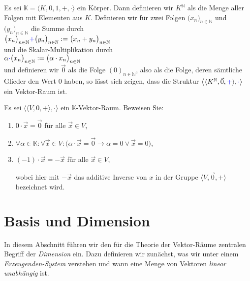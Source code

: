 \example
Es sei $\mathbb{K} = \langle K, 0,1,+,\cdot\rangle$ ein K\"{o}rper.  Dann definieren wir $K^\mathbb{N}$ als die Menge aller
Folgen mit Elementen aus $K$.  Definieren wir f\"{u}r zwei
Folgen
$\bigl(x_n\bigr)_{n\in\mathbb{N}}$ und $\bigl(y_n\bigr)_{n\in\mathbb{N}}$ die Summe durch
\\[0.2cm]
\hspace*{1.3cm}
$\bigl(x_n\bigr)_{n\in\mathbb{N}} {\color{blue}{+}} \bigl(y_n\bigr)_{n\in\mathbb{N}} := \bigl(x_n + y_n\bigr)_{n\in\mathbb{N}}$ 
\\[0.2cm]
und die Skalar-Multiplikation durch
\\[0.2cm]
\hspace*{1.3cm}
$\alpha {\color{blue}{\cdot}} \bigl(x_n\bigr)_{n\in\mathbb{N}} := \bigl(\alpha \cdot x_n \bigr)_{n\in\mathbb{N}}$
\\[0.2cm]
und definieren wir $\vec{0}$ als die Folge $(0)_{n\in\mathbb{N}}$, also als die Folge,
deren s\"{a}mtliche Glieder den Wert $0$ haben, so l\"{a}sst sich zeigen, dass die Struktur
 $\bigl\langle\langle K^\mathbb{N}, \vec{0}, {\color{blue}{+}}\rangle, {\color{blue}{\cdot}}\rangle$  ein Vektor-Raum ist.
\eox


\exercise
Es sei $\bigl\langle \langle V, 0, +\rangle, \cdot\bigr\rangle$ ein $\mathbb{K}$-Vektor-Raum.  Beweisen Sie:
\renewcommand{\labelenumi}{(\alph{enumi})}
\begin{enumerate}
\item $0 \cdot \vec{x} = \vec{0}$ \quad f\"ur alle $\vec{x} \in V$,
\item $\forall \alpha \in \mathbb{K}: \forall \vec{x} \in V: \bigl(\alpha \cdot \vec{x} = \vec{0} \rightarrow \alpha = 0 \vee \vec{x} = 0\bigr)$,
\item $(-1) \cdot \vec{x} = -\vec{x}$ \quad f\"ur alle $\vec{x} \in V$,

      wobei hier mit $-\vec{x}$ das additive Inverse von $x$ in der Gruppe $\langle V, \vec{0}, +\rangle$
      bezeichnet wird. 
      \eoxs
\end{enumerate}
\renewcommand{\labelenumi}{\arabic{enumi}.}

\section{Basis und Dimension}
In diesem Abschnitt f\"{u}hren wir den f\"{u}r die Theorie der Vektor-R\"{a}ume zentralen Begriff
der {\emph{\color{blue}Dimension}}
ein.  Dazu definieren wir zun\"{a}chst, was wir unter einem {\emph{\color{blue}Erzeugenden-System}}
verstehen und wann eine Menge von Vektoren {\emph{\color{blue}linear unabh\"{a}ngig}} ist.

